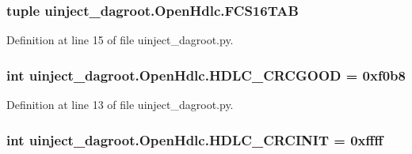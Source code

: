 \subsubsection[{\texorpdfstring{F\+C\+S16\+T\+AB}{FCS16TAB}}]{\setlength{\rightskip}{0pt plus 5cm}tuple uinject\+\_\+dagroot.\+Open\+Hdlc.\+F\+C\+S16\+T\+AB\hspace{0.3cm}{\ttfamily [static]}}\hypertarget{classuinject__dagroot_1_1_open_hdlc_a6fa5e8e2712ec2a0b306e9a3b4d3820a}{}\label{classuinject__dagroot_1_1_open_hdlc_a6fa5e8e2712ec2a0b306e9a3b4d3820a}


Definition at line 15 of file uinject\+\_\+dagroot.\+py.

\subsubsection[{\texorpdfstring{H\+D\+L\+C\+\_\+\+C\+R\+C\+G\+O\+OD}{HDLC_CRCGOOD}}]{\setlength{\rightskip}{0pt plus 5cm}int uinject\+\_\+dagroot.\+Open\+Hdlc.\+H\+D\+L\+C\+\_\+\+C\+R\+C\+G\+O\+OD = 0xf0b8\hspace{0.3cm}{\ttfamily [static]}}\hypertarget{classuinject__dagroot_1_1_open_hdlc_ac89e62e50a8670281cf6a87f8d517eb0}{}\label{classuinject__dagroot_1_1_open_hdlc_ac89e62e50a8670281cf6a87f8d517eb0}


Definition at line 13 of file uinject\+\_\+dagroot.\+py.

\subsubsection[{\texorpdfstring{H\+D\+L\+C\+\_\+\+C\+R\+C\+I\+N\+IT}{HDLC_CRCINIT}}]{\setlength{\rightskip}{0pt plus 5cm}int uinject\+\_\+dagroot.\+Open\+Hdlc.\+H\+D\+L\+C\+\_\+\+C\+R\+C\+I\+N\+IT = 0xffff\hspace{0.3cm}{\ttfamily [static]}}\hypertarget{classuinject__dagroot_1_1_open_hdlc_a2eab537e67ea04bb40dc429a289694a4}{}\label{classuinject__dagroot_1_1_open_hdlc_a2eab537e67ea04bb40dc429a289694a4}


